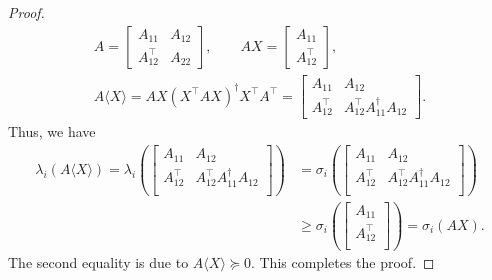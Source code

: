 \documentclass[onefignum,onetabnum]{siamart251216}
\begin{document}
\begin{proof}
    \[
    \begin{gathered}
        A =
        \begin{bmatrix}
            A_{11} & A_{12} \\
            A_{12}^\top & A_{22}
        \end{bmatrix},
        \qquad
        AX =
        \begin{bmatrix}
            A_{11} \\
            A_{12}^\top
        \end{bmatrix},
        \\[0.5em]
        A \langle X \rangle
        =
        AX (X^\top A X)^{\dagger} X^\top A^\top
        =
        \begin{bmatrix}
            A_{11} & A_{12} \\
            A_{12}^\top & A_{12}^\top A_{11}^{\dagger} A_{12}
        \end{bmatrix}.
    \end{gathered}
    \]
    Thus, we have
    \[
        \begin{aligned}
            \lambda_i(A\langle X \rangle)
            =
            \lambda_{i} \left(
                        \begin{bmatrix}
                        A_{11} & A_{12} \\
                        A_{12}^\top & A_{12}^\top A_{11}^{\dagger} A_{12} \\
                        \end{bmatrix}
                        \right)
            & =
            \sigma_{i} \left(
                        \begin{bmatrix}
                        A_{11} & A_{12} \\
                        A_{12}^\top & A_{12}^\top A_{11}^{\dagger} A_{12} \\
                        \end{bmatrix}
                        \right)
            \\
            & \geq
            \sigma_{i} \left(
                       \begin{bmatrix}
                       A_{11} \\
                       A_{12}^\top \\
                       \end{bmatrix}
                       \right)
            =
            \sigma_i(AX).
        \end{aligned}
    \]
    The second equality is due to $A \langle X \rangle \succeq 0$. This completes the proof.
\end{proof}
\end{document}
